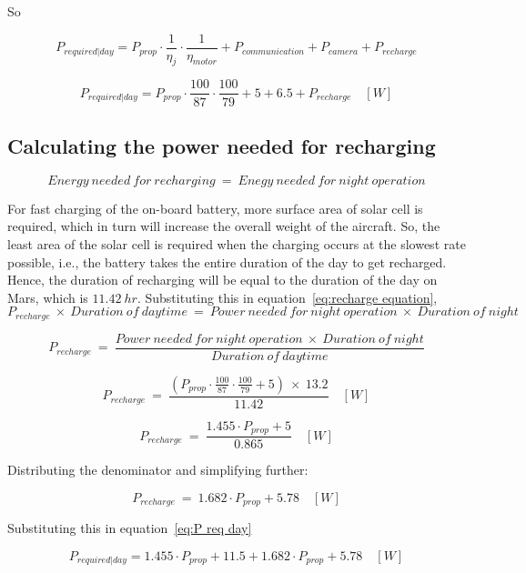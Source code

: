 \p So

\[
P_{required|day} = P_{prop} \cdot \frac{1}{\eta_j} \cdot \frac{1}{\eta_{motor}} + P_{communication} + P_{camera} + P_{recharge}
\]

\[
P_{required|day} = P_{prop} \cdot \frac{100}{87} \cdot \frac{100}{79} + 5 + 6.5 + P_{recharge} \quad [W]
\]

\subsection{Calculating the power needed for recharging}

\vspace{0.2cm}

\[
Energy \ needed \ for \ recharging \ = \ Enegy \ needed \ for \ night \ operation
\]


\p For fast charging of the on-board battery, more surface area of solar cell is required, which in turn will increase the overall weight of the aircraft. So, the least area of the solar cell is required when the charging occurs at the slowest rate possible, i.e., the battery takes the entire duration of the day to get recharged. Hence, the duration of recharging will be equal to the duration of the day on Mars, which is $ 11.42 \ hr $. Substituting this in equation~\ref{eq:recharge equation},
\[
P_{recharge} \ \times \ Duration \ of \ daytime \ = \ Power \ needed \ for \ night \ operation \ \times \ Duration \ of \ night
\]

\[
P_{recharge} \ = \ \frac{ Power \ needed \ for \ night \ operation \ \times \ Duration \ of \ night }{ Duration \ of \ daytime } 
\]

\[
P_{recharge} \ = \ \frac{ \left(P_{prop} \cdot \frac{100}{87} \cdot \frac{100}{79} + 5 \right) \ \times \ 13.2 }{ 11.42 } \quad [W] 
\]

\[
P_{recharge} \ = \ \frac{ 1.455 \cdot P_{prop} + 5 }{ 0.865 } \quad [W] 
\]

Distributing the denominator and simplifying further:

\[
P_{recharge} \ = \ 1.682 \cdot P_{prop} + 5.78 \quad [W] 
\] 

Substituting this in equation~\ref{eq:P req day}

\[
P_{required|day} = 1.455 \cdot P_{prop} + 11.5 + 1.682 \cdot P_{prop} + 5.78 \quad [W]
\]

